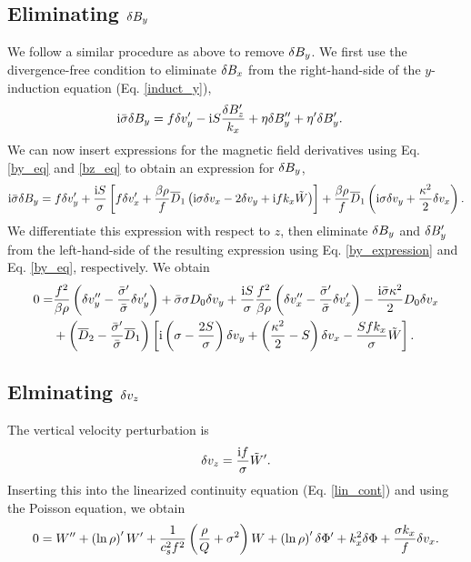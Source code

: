 \subsection{Eliminating $\delta B_y$}
We follow a similar procedure as above to remove $\delta B_y$. We first use
the divergence-free condition to eliminate $\delta B_x$ from the
right-hand-side of the $y$-induction equation (Eq. \ref{induct_y}),
\begin{align}
  &\mathrm{i}\bar{\sigma}\delta B_y = f\delta v_y^\prime - \mathrm{i}
  S\frac{\delta B_z^\prime}{k_x} +
  \eta\delta B_y^{\prime\prime}+\eta^\prime\delta B_y^\prime.  
\end{align}
We can now insert expressions for the magnetic field derivatives using
Eq. \ref{by_eq} and \ref{bz_eq} to obtain an expression for $\delta B_y$, 
\begin{align}
  \mathrm{i}\bar{\sigma}\delta B_y = f \delta v_y^\prime + \frac{\mathrm{i} S}{\sigma}\left[
    f\delta v_x^\prime + \frac{\beta\rho}{f}\overline{D}_1\left(\mathrm{i}\sigma\delta v_x -
  2\delta v_y + \mathrm{i} f k_x\tilde{W} \right)\right] +
  \frac{\beta\rho}{f}\overline{D}_1\left(\mathrm{i}\sigma\delta v_y +
  \frac{\kappa^2}{2}\delta v_x\right). \label{by_expression}
\end{align}
We differentiate this expression with respect to $z$, then eliminate 
$\delta B_y$ and  $\delta B_y^\prime$ from the left-hand-side of the resulting
expression using Eq. \ref{by_expression} and 
Eq. \ref{by_eq}, respectively. We obtain
\begin{align}
  0 =& \frac{f^2}{\beta\rho}\left(\delta v_y^{\prime\prime} -
  \frac{\bar{\sigma}^\prime}{\bar{\sigma}}\delta v_y^\prime\right) 
  + \bar{\sigma}\sigma D_0\delta v_y  + \frac{\mathrm{i} 
    S}{\sigma}\frac{f^2}{\beta\rho}\left(\delta v_x^{\prime\prime} -
    \frac{\bar{\sigma}^\prime}{\bar{\sigma}}\delta v_x^\prime\right) -
    \frac{\mathrm{i}\bar{\sigma}\kappa^2}{2}D_0\delta v_x \notag\\
    & + \left(\overline{D}_2 -
    \frac{\bar{\sigma}^\prime}{\bar{\sigma}}\overline{D}_1\right)\left[\mathrm{i}\left(\sigma
      - \frac{2S}{\sigma}\right)\delta v_y + \left(\frac{\kappa^2}{2} -
      S\right)\delta v_x - \frac{Sfk_x}{\sigma}\tilde{W}\right]. \label{final_vy}
\end{align}

\subsection{Elminating $\delta v_z$}
The vertical velocity perturbation is
\begin{align}
  \delta v_z = \frac{\mathrm{i} f}{\sigma}\tilde{W}^\prime. 
\end{align}
Inserting this into the linearized continuity equation
(Eq. \ref{lin_cont}) and using the Poisson equation, we obtain
\begin{align}
0=  W^{\prime\prime} + \left(\ln{\rho}\right)^\prime W^\prime +
  \frac{1}{c_s^2f^2}\left(\frac{\rho}{Q} + \sigma^2\right)W +
  \left(\ln{\rho}\right)^\prime\delta \Phi^\prime + k_x^2\delta \Phi + \frac{\sigma
  k_x}{f}\delta v_x.\label{final_w}
\end{align}
